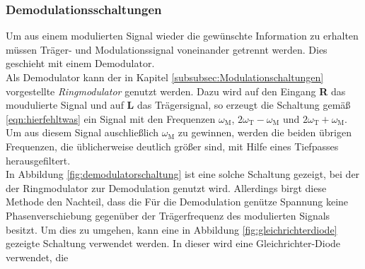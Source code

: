 \subsubsection{Demodulationsschaltungen}
\label{subsubsec:demodulationschaltungen}
Um aus einem modulierten Signal wieder die gewünschte Information zu erhalten
müssen Träger- und Modulationssignal voneinander getrennt werden.
Dies geschieht mit einem Demodulator.\\
Als Demodulator kann der in Kapitel \ref{subsubsec:Modulationschaltungen}
vorgestellte \textit{Ringmodulator} genutzt werden.
Dazu wird auf den Eingang \textbf{R} das moudulierte Signal und
auf \textbf{L} das Trägersignal, so erzeugt die Schaltung
gemäß \eqref{eqn:hierfehltwas} ein Signal mit den Frequenzen
$\omega_{\text{M}}$, $2\omega_{\text{T}} - \omega_{\text{M}}$
und $2\omega_{\text{T}} + \omega_{\text{M}}$.
Um aus diesem Signal auschließlich $\omega_{\text{M}}$ zu gewinnen,
werden die beiden übrigen Frequenzen, die üblicherweise deutlich größer sind,
mit Hilfe eines Tiefpasses herausgefiltert.\\
In Abbildung \ref{fig:demodulatorschaltung} ist eine solche Schaltung gezeigt,
bei der der Ringmodulator zur Demodulation genutzt wird. Allerdings
birgt diese Methode den Nachteil, dass die Für die Demodulation genütze
Spannung keine Phasenverschiebung gegenüber der Trägerfrequenz des
modulierten Signals besitzt.
Um dies zu umgehen, kann eine in Abbildung \ref{fig:gleichrichterdiode} gezeigte
Schaltung verwendet werden. In dieser wird eine Gleichrichter-Diode verwendet,
die 
